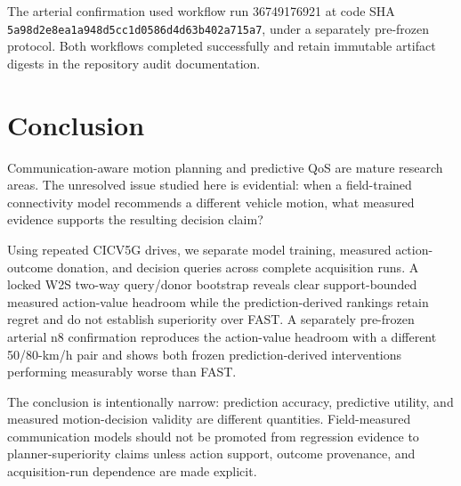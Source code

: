 \documentclass[journal]{IEEEtran}
\begin{document}
The arterial confirmation used workflow run 36749176921 at code SHA
\texttt{5a98d2e8ea1a948d5cc1d0586d4d63b402a715a7}, under a separately pre-frozen protocol. Both workflows completed successfully and retain immutable artifact digests in the repository audit documentation.

\section{Conclusion}
Communication-aware motion planning and predictive QoS are mature research areas. The unresolved issue studied here is evidential: when a field-trained connectivity model recommends a different vehicle motion, what measured evidence supports the resulting decision claim?

Using repeated CICV5G drives, we separate model training, measured action-outcome donation, and decision queries across complete acquisition runs. A locked W2S two-way query/donor bootstrap reveals clear support-bounded measured action-value headroom while the prediction-derived rankings retain regret and do not establish superiority over FAST. A separately pre-frozen arterial n8 confirmation reproduces the action-value headroom with a different 50/80-km/h pair and shows both frozen prediction-derived interventions performing measurably worse than FAST.

The conclusion is intentionally narrow: prediction accuracy, predictive utility, and measured motion-decision validity are different quantities. Field-measured communication models should not be promoted from regression evidence to planner-superiority claims unless action support, outcome provenance, and acquisition-run dependence are made explicit.



\end{document}
